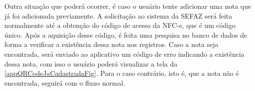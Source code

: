 \begin{figure}[h]
    \label{appQRCodeNaoDisponivelFig}
\end{figure}

\newpage
Outra situação que poderá ocorrer, é caso o usuário tente adicionar uma nota que já foi adicionada previamente. A solicitação ao sistema da SEFAZ será feita normalmente até a obtenção do código de acesso da NFC-e, que é um código único. Após a aquisição desse código, é feita uma pesquisa no banco de dados de forma a verificar a existência dessa nota nos registros. Caso a nota seja encontrada, será enviado ao aplicativo um código de erro indicando a existência dessa nota, com isso o usuário poderá visualizar a tela da \autoref{appQRCodeJaCadastradaFig}. Para o caso contrário, isto é, que a nota não é encontrada, seguirá com o fluxo normal.

